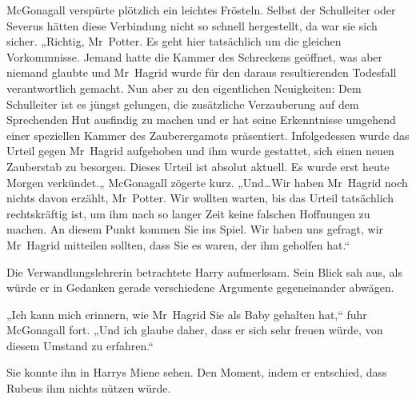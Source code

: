 McGonagall verspürte plötzlich ein leichtes Frösteln. Selbst der Schulleiter oder Severus hätten diese Verbindung nicht so schnell hergestellt, da war sie sich sicher. „Richtig, Mr~Potter. Es geht hier tatsächlich um die gleichen Vorkommnisse. Jemand hatte die Kammer des Schreckens geöffnet, was aber niemand glaubte und Mr~Hagrid wurde für den daraus resultierenden Todesfall verantwortlich gemacht.
Nun aber zu den eigentlichen Neuigkeiten: Dem Schulleiter ist es jüngst gelungen, die zusätzliche Verzauberung auf dem Sprechenden Hut ausfindig zu machen und er hat seine Erkenntnisse umgehend einer speziellen Kammer des Zauberergamots präsentiert. Infolgedessen wurde das Urteil gegen Mr~Hagrid aufgehoben und ihm wurde gestattet, sich einen neuen Zauberstab zu besorgen. Dieses Urteil ist absolut aktuell. Es wurde erst heute Morgen verkündet.„ McGonagall zögerte kurz. „Und…Wir haben Mr~Hagrid noch nichts davon erzählt, Mr~Potter. Wir wollten warten, bis das Urteil tatsächlich rechtskräftig ist, um ihm nach so langer Zeit keine falschen Hoffnungen zu machen. An diesem Punkt kommen Sie ins Spiel. Wir haben uns gefragt, wir Mr~Hagrid mitteilen sollten, dass Sie es waren, der ihm geholfen hat.“

Die Verwandlungslehrerin betrachtete Harry aufmerksam. Sein Blick sah aus, als würde er in Gedanken gerade verschiedene Argumente gegeneinander abwägen.

„Ich kann mich erinnern, wie Mr~Hagrid Sie als Baby gehalten hat,“ fuhr McGonagall fort. „Und ich glaube daher, dass er sich sehr freuen würde, von diesem Umstand zu erfahren.“

Sie konnte ihn in Harrys Miene sehen. Den Moment, indem er entschied, dass Rubeus ihm nichts nützen würde.

